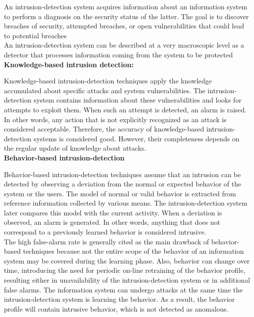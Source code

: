 \documentclass{article}
\begin{document}
An intrusion-detection system acquires information about an information system to perform a diagnosis on
the security status of the latter. The goal is to discover breaches of security, attempted breaches, or open
vulnerabilities that could lead to potential breaches\\

An intrusion-detection system can be described at a very macroscopic level as a detector that processes
information coming from the system to be protected\\


\textbf{Knowledge-based intrusion detection:}

Knowledge-based intrusion-detection techniques apply the knowledge accumulated about specific attacks and
system vulnerabilities. The intrusion-detection system contains information about these vulnerabilities and
looks for
attempts
to exploit them. When such an attempt is detected, an alarm is raised. In other words,
any action that is not explicitly recognized as an attack is considered acceptable. Therefore, the
accuracy
of knowledge-based intrusion-detection systems is considered good. However, their
completeness
depends on
the regular update of knowledge about attacks.\\


\textbf{Behavior-based intrusion-detection}

Behavior-based intrusion-detection techniques assume that an intrusion can be detected by observing a
deviation from the normal or expected behavior of the system or the users. The model of normal or valid
behavior is extracted from reference information collected by various means. The intrusion-detection system
later compares this model with the current activity. When a deviation is observed, an alarm is generated.
In other words, anything that does not correspond to a previously learned behavior is considered intrusive.\\

The high false-alarm rate is generally cited as the main drawback of behavior-based techniques because
not the entire scope of the behavior of an information system may be covered during the learning phase.
Also, behavior can change over time, introducing the need for periodic on-line retraining of the behavior
profile, resulting either in unavailability of the intrusion-detection system or in additional false alarms.
The information system can undergo attacks at the same time the intrusion-detection system is learning
the behavior.  As a result, the behavior profile will contain intrusive behavior, which is not detected as
anomalous.
\end{document}
